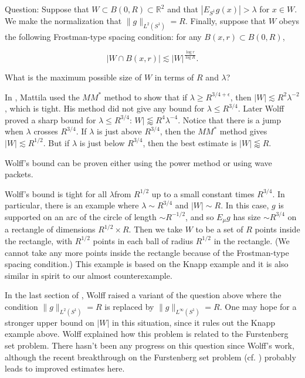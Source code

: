 \documentclass{amsart}
\newcommand{\eps}{\epsilon}
\newcommand{\RR}{\mathbb{R}}
\begin{document}
Question: Suppose that $W \subset B(0, R) \subset \RR^2$ and that $| E_{S^1} g (x) | > \lambda$ for $x \in W$.  We make the normalization that $\| g \|_{L^2(S^1)} = R$.  Finally, suppose that $W$ obeys the following Frostman-type spacing condition: for any $B(x,r) \subset B(0, R)$, 

$$  | W \cap B(x,r) | \lesssim |W|^{\frac{\log r}{\log R}}. $$

\noindent What is the maximum possible size of $W$ in terms of $R$ and $\lambda$?

In \cite{Ma}, Mattila used the $M M^*$ method to show that if $\lambda \ge R^{3/4 + \eps}$, then $|W| \lesssim R^2 \lambda^{-2}$, which is tight.  His method did not give any bound for $\lambda \le R^{3/4}$.  Later Wolff \cite{W} proved a sharp bound for $\lambda \le R^{3/4}$: $W| \lessapprox R^4 \lambda^{-4}$.   Notice that there is a jump when $\lambda$ crosses $R^{3/4}$.  If $\lambda$ is just above $R^{3/4}$, then the $M M^*$ method gives $|W| \lesssim R^{1/2}$.  But if $\lambda$ is just below $R^{3/4}$, then the best estimate is $|W| \lessapprox R$.  

Wolff's bound can be proven either using the power method or using wave packets.

Wolff's bound is tight for all $\lambda$from $R^{1/2}$ up to  a small constant times $R^{3/4}$.   In particular, there is an example where $\lambda \sim R^{3/4}$ and $|W| \sim R$.   In this case, $g$ is supported on an arc of the circle of length $\sim R^{-1/2}$, and so $E_\mu g$ has size $\sim R^{3/4}$ on a rectangle of dimensions $R^{1/2} \times R$.  Then we take $W$ to be a set of $R$ points inside the rectangle, with $R^{1/2}$ points in each ball of radius $R^{1/2}$ in the rectangle.  (We cannot take any more points inside the rectangle because of the Frostman-type spacing condition.)   This example is based on the Knapp example and it is also similar in spirit to our almost counterexample.

In the last section of \cite{W}, Wolff raised a variant of the question above where the condition $\| g \|_{L^2(S^1)} = R$ is replaced by $\| g \|_{L^\infty(S^1)} = R$.   One may hope for a stronger upper bound on $|W|$ in this situation, since it rules out the Knapp example above.   Wolff explained how this problem is related to the Furstenberg set problem.   There hasn't been any progress on this question since Wolff's work,  although the recent breakthrough on the Furstenberg set problem (cf. \cite{RW}) probably leads to improved estimates here. 
\end{document}
